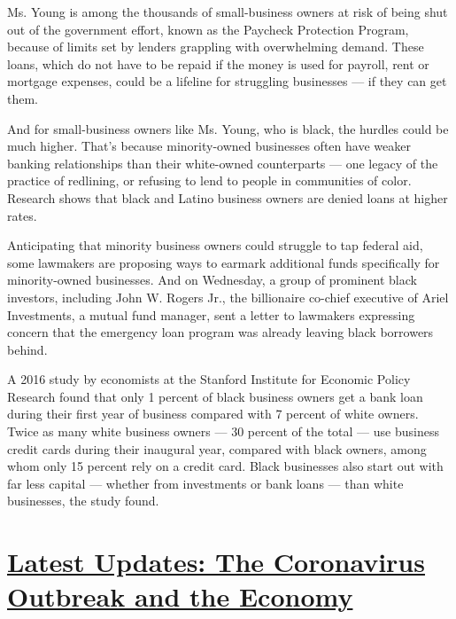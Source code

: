 Ms. Young is among the thousands of small-business owners at risk of
being shut out of the government effort, known as the Paycheck
Protection Program, because of limits set by lenders grappling with
overwhelming demand. These loans, which do not have to be repaid if the
money is used for payroll, rent or mortgage expenses, could be a
lifeline for struggling businesses --- if they can get them.

And for small-business owners like Ms. Young, who is black, the hurdles
could be much higher. That's because minority-owned businesses often
have weaker banking relationships than their white-owned counterparts
--- one legacy of the practice of redlining, or refusing to lend to
people in communities of color. Research shows that black and Latino
business owners are denied loans at higher rates.

Anticipating that minority business owners could struggle to tap federal
aid, some lawmakers are proposing ways to earmark additional funds
specifically for minority-owned businesses. And on Wednesday, a group of
prominent black investors, including John W. Rogers Jr., the billionaire
co-chief executive of Ariel Investments, a mutual fund manager, sent a
letter to lawmakers expressing concern that the emergency loan program
was already leaving black borrowers behind.

A 2016 study by economists at the Stanford Institute for Economic Policy
Research found that only 1 percent of black business owners get a bank
loan during their first year of business compared with 7 percent of
white owners. Twice as many white business owners --- 30 percent of the
total --- use business credit cards during their inaugural year,
compared with black owners, among whom only 15 percent rely on a credit
card. Black businesses also start out with far less capital --- whether
from investments or bank loans --- than white businesses, the study
found.

\hypertarget{latest-updates-the-coronavirus-outbreak-and-the-economy}{%
\section{\texorpdfstring{\href{https://www.nytimes3xbfgragh.onion/live/2020/09/08/business/stock-market-today-coronavirus?action=click\&pgtype=Article\&state=default\&region=MAIN_CONTENT_1\&context=storylines_live_updates}{Latest
Updates: The Coronavirus Outbreak and the
Economy}}{Latest Updates: The Coronavirus Outbreak and the Economy}}\label{latest-updates-the-coronavirus-outbreak-and-the-economy}}

